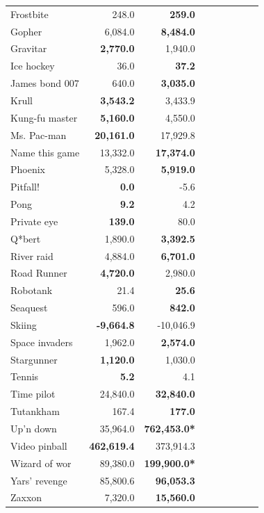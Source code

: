 \begin{table}[ht]
\begin{center}
\begin{small}
\begin{tabular}{lrrrrrrrl}
Frostbite       & 248.0                & \textbf{259.0}       \\
Gopher          & 6,084.0              & \textbf{8,484.0}     \\
Gravitar        & \textbf{2,770.0}     & 1,940.0              \\
Ice hockey      & 36.0                 & \textbf{37.2}        \\
James bond 007  & 640.0                & \textbf{3,035.0}     \\
Krull           & \textbf{3,543.2}     & 3,433.9              \\
Kung-fu master  & \textbf{5,160.0}     & 4,550.0              \\
Ms. Pac-man     & \textbf{20,161.0}    & 17,929.8             \\
Name this game  & 13,332.0             & \textbf{17,374.0}    \\
Phoenix         & 5,328.0              & \textbf{5,919.0}     \\
Pitfall!        & \textbf{0.0}         & -5.6                 \\
Pong            & \textbf{9.2}         & 4.2                  \\
Private eye     & \textbf{139.0}       & 80.0                 \\
Q*bert          & 1,890.0              & \textbf{3,392.5}     \\
River raid      & 4,884.0              & \textbf{6,701.0}     \\
Road Runner     & \textbf{4,720.0}     & 2,980.0              \\
Robotank        & 21.4                 & \textbf{25.6}        \\
Seaquest        & 596.0                & \textbf{842.0}       \\
Skiing          & \textbf{-9,664.8}    & -10,046.9            \\
Space invaders  & 1,962.0              & \textbf{2,574.0}     \\
Stargunner      & \textbf{1,120.0}     & 1,030.0              \\
Tennis          & \textbf{5.2}         & 4.1                  \\
Time pilot      & 24,840.0             & \textbf{32,840.0}    \\
Tutankham       & 167.4                & \textbf{177.0}       \\
Up'n down       & 35,964.0             & \textbf{762,453.0*}   \\
Video pinball   & \textbf{462,619.4}   & 373,914.3            \\
Wizard of wor   & 89,380.0             & \textbf{199,900.0*}   \\
Yars' revenge   & 85,800.6             & \textbf{96,053.3}    \\
Zaxxon          & 7,320.0              & \textbf{15,560.0}    \\


\end{tabular}
\end{small}
\end{center}
\end{table}
